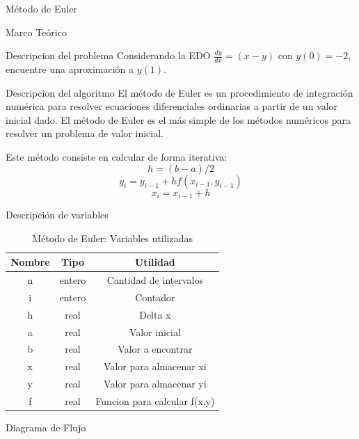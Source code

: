 \documentclass[letterpaper, 12pt]{article}
\begin{document}
  \begin{section}{Método de Euler}
    \begin{subsection}{Marco Teórico}
      \begin{subsubsection}{Descripcion del problema}
        Considerando la EDO $\frac{dy}{dx} = (x -y)$ con $y(0)=-2$, encuentre una aproximación a $y(1)$.
      \end{subsubsection}
      \begin{subsubsection}{Descripcion del algoritmo}
        El método de Euler es un procedimiento de integración numérica para resolver ecuaciones diferenciales ordinarias a partir de un valor inicial dado. El método de Euler es el más simple de los métodos numéricos para resolver un problema de valor inicial.

        Este método consiste en calcular de forma iterativa:
        \[h = (b - a)/2\]
        \[y_i = y_{i-1} + hf(x_{i-1},y_{i-1})\]
        \[x_i = x_{i-1} + h\]
      \end{subsubsection}
    \end{subsection}
    \begin{subsection}{Descripción de variables}
      \begin{table}[h]
        \centering
        \begin{tabular}{|c c c|}
          \hline
          Nombre & Tipo & Utilidad\\
          \hline\hline
          n & entero & Cantidad de intervalos \\
          i & entero & Contador \\
          h & real & Delta x \\
          a & real & Valor inicial \\
          b & real & Valor a encontrar \\
          x & real & Valor para almacenar xi \\
          y & real & Valor para almacenar yi\\
          f & real & Funcion para calcular f(x,y) \\
          \hline
        \end{tabular}
        \caption{Método de Euler: Variables utilizadas}
      \end{table}
    \end{subsection}
    \newpage
    \begin{subsection}{Diagrama de Flujo}
      \begin{figure}[h]
        \centering
        

\end{figure}
\end{subsection}
\end{section}
\end{document}

